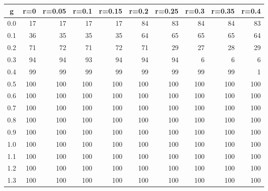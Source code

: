 %
\begin{table}[!tbp]
 \begin{center}
 \begin{tabular}{rrrrrrrrrr}\hline\hline
\multicolumn{1}{c}{g}&\multicolumn{1}{c}{r=0}&\multicolumn{1}{c}{r=0.05}&\multicolumn{1}{c}{r=0.1}&\multicolumn{1}{c}{r=0.15}&\multicolumn{1}{c}{r=0.2}&\multicolumn{1}{c}{r=0.25}&\multicolumn{1}{c}{r=0.3}&\multicolumn{1}{c}{r=0.35}&\multicolumn{1}{c}{r=0.4}\tabularnewline
\hline
0.0& 17& 17& 17& 17& 84& 83& 84& 84& 83\tabularnewline
0.1& 36& 35& 35& 35& 64& 65& 65& 65& 64\tabularnewline
0.2& 71& 72& 71& 72& 71& 29& 27& 28& 29\tabularnewline
0.3& 94& 94& 93& 94& 94& 94&  6&  6&  6\tabularnewline
0.4& 99& 99& 99& 99& 99& 99& 99& 99&  1\tabularnewline
0.5&100&100&100&100&100&100&100&100&100\tabularnewline
0.6&100&100&100&100&100&100&100&100&100\tabularnewline
0.7&100&100&100&100&100&100&100&100&100\tabularnewline
0.8&100&100&100&100&100&100&100&100&100\tabularnewline
0.9&100&100&100&100&100&100&100&100&100\tabularnewline
1.0&100&100&100&100&100&100&100&100&100\tabularnewline
1.1&100&100&100&100&100&100&100&100&100\tabularnewline
1.2&100&100&100&100&100&100&100&100&100\tabularnewline
1.3&100&100&100&100&100&100&100&100&100\tabularnewline
\hline
\end{tabular}

\end{center}

\end{table}

